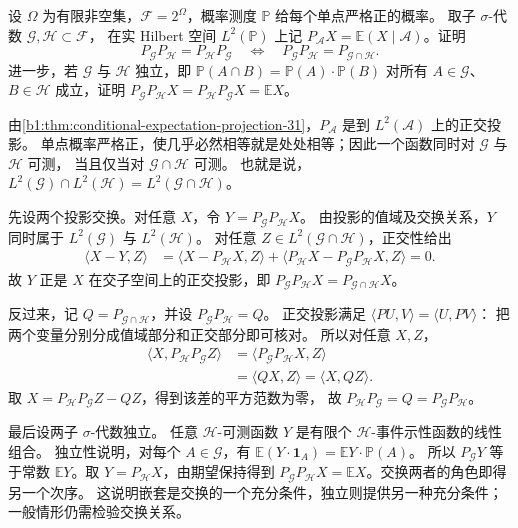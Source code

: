 \BookExercises

\begin{exercise}\label{b1:ex:31-noncommuting-conditionals}
设 \(\Omega\) 为有限非空集，\(\mathcal F=2^\Omega\)，概率测度 \(\mathbb P\) 给每个单点严格正的概率。
取子 \(\sigma\)-代数 \(\mathcal G,\mathcal H\subset\mathcal F\)，
在实 Hilbert 空间 \(L^2(\mathbb P)\) 上记
\(P_{\mathcal A}X=\mathbb E(X\mid\mathcal A)\)。证明
\[
 P_{\mathcal G}P_{\mathcal H}=P_{\mathcal H}P_{\mathcal G}
 \quad\Longleftrightarrow\quad
 P_{\mathcal G}P_{\mathcal H}=P_{\mathcal G\cap\mathcal H}.
\]
进一步，若 \(\mathcal G\) 与 \(\mathcal H\) 独立，即
\(\mathbb P(A\cap B)=\mathbb P(A)\cdot\mathbb P(B)\) 对所有
\(A\in\mathcal G\)、\(B\in\mathcal H\) 成立，证明
\(P_{\mathcal G}P_{\mathcal H}X=P_{\mathcal H}P_{\mathcal G}X=\mathbb EX\)。
\end{exercise}
\begin{solution}
由\cref{b1:thm:conditional-expectation-projection-31}，\(P_{\mathcal A}\) 是到
\(L^2(\mathcal A)\) 上的正交投影。
单点概率严格正，使几乎必然相等就是处处相等；因此一个函数同时对 \(\mathcal G\) 与 \(\mathcal H\) 可测，
当且仅当对 \(\mathcal G\cap\mathcal H\) 可测。
也就是说，\(L^2(\mathcal G)\cap L^2(\mathcal H)=L^2(\mathcal G\cap\mathcal H)\)。

先设两个投影交换。对任意 \(X\)，令 \(Y=P_{\mathcal G}P_{\mathcal H}X\)。
由投影的值域及交换关系，\(Y\) 同时属于 \(L^2(\mathcal G)\) 与 \(L^2(\mathcal H)\)。
对任意 \(Z\in L^2(\mathcal G\cap\mathcal H)\)，正交性给出
\[
 \begin{aligned}
 \langle X-Y,Z\rangle
 &=\langle X-P_{\mathcal H}X,Z\rangle
  +\langle P_{\mathcal H}X-P_{\mathcal G}P_{\mathcal H}X,Z\rangle=0.
 \end{aligned}
\]
故 \(Y\) 正是 \(X\) 在交子空间上的正交投影，即
\(P_{\mathcal G}P_{\mathcal H}X=P_{\mathcal G\cap\mathcal H}X\)。

反过来，记 \(Q=P_{\mathcal G\cap\mathcal H}\)，并设 \(P_{\mathcal G}P_{\mathcal H}=Q\)。
正交投影满足 \(\langle PU,V\rangle=\langle U,PV\rangle\)：
把两个变量分别分成值域部分和正交部分即可核对。
所以对任意 \(X,Z\)，
\[
 \begin{aligned}
 \langle X,P_{\mathcal H}P_{\mathcal G}Z\rangle
 &=\langle P_{\mathcal G}P_{\mathcal H}X,Z\rangle\\
 &=\langle QX,Z\rangle=\langle X,QZ\rangle.
 \end{aligned}
\]
取 \(X=P_{\mathcal H}P_{\mathcal G}Z-QZ\)，得到该差的平方范数为零，
故 \(P_{\mathcal H}P_{\mathcal G}=Q=P_{\mathcal G}P_{\mathcal H}\)。

最后设两子 \(\sigma\)-代数独立。
任意 \(\mathcal H\)-可测函数 \(Y\) 是有限个 \(\mathcal H\)-事件示性函数的线性组合。
独立性说明，对每个 \(A\in\mathcal G\)，有
\(\mathbb E(Y\cdot\mathbf1_A)=\mathbb EY\cdot\mathbb P(A)\)。
所以 \(P_{\mathcal G}Y\) 等于常数 \(\mathbb EY\)。取 \(Y=P_{\mathcal H}X\)，由期望保持得到
\(P_{\mathcal G}P_{\mathcal H}X=\mathbb EX\)。交换两者的角色即得另一个次序。
这说明嵌套是交换的一个充分条件，独立则提供另一种充分条件；一般情形仍需检验交换关系。
\end{solution}

